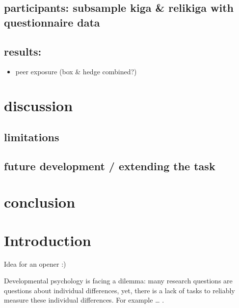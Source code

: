 \documentclass[
  english,
  man,floatsintext]{apa6}
\providecommand{\tightlist}{%
  \setlength{\itemsep}{0pt}\setlength{\parskip}{0pt}}
\begin{document}
\hypertarget{participants-subsample-kiga-relikiga-with-questionnaire-data}{%
\subsection{participants: subsample kiga \& relikiga with questionnaire data}\label{participants-subsample-kiga-relikiga-with-questionnaire-data}}

\hypertarget{results-2}{%
\subsection{results:}\label{results-2}}

\begin{itemize}
\tightlist
\item
  peer exposure (box \& hedge combined?)
\end{itemize}

\hypertarget{discussion}{%
\section{discussion}\label{discussion}}

\hypertarget{limitations}{%
\subsection{limitations}\label{limitations}}

\hypertarget{future-development-extending-the-task}{%
\subsection{future development / extending the task}\label{future-development-extending-the-task}}

\hypertarget{conclusion}{%
\section{conclusion}\label{conclusion}}

\newpage

\hypertarget{introduction}{%
\section{Introduction}\label{introduction}}

Idea for an opener :)

Developmental psychology is facing a dilemma: many research questions are questions about individual differences, yet, there is a lack of tasks to reliably measure these individual differences. For example \ldots{} .
\end{document}
